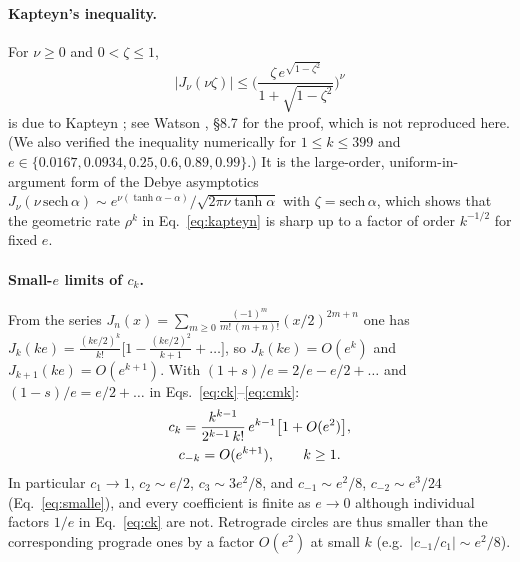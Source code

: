 \paragraph*{Kapteyn's inequality.}
For $\nu\ge0$ and $0<\zeta\le1$,
\begin{equation}
|J_\nu(\nu\zeta)|\le\Bigg(\frac{\zeta\,e^{\sqrt{1-\zeta^2}}}{1+\sqrt{1-\zeta^2}}\Bigg)^{\nu}
\label{eq:kapteyn-app}
\end{equation}
is due to Kapteyn \cite{Kapteyn1893}; see Watson \cite{Watson1944}, \S8.7 for
the proof, which is not reproduced here. (We also verified the inequality
numerically for $1\le k\le399$ and $e\in\{0.0167,0.0934,0.25,0.6,0.89,0.99\}$.)
It is the large-order, uniform-in-argument form of the Debye asymptotics
$J_\nu(\nu\,\mathrm{sech}\,\alpha)\sim e^{\nu(\tanh\alpha-\alpha)}/\sqrt{2\pi\nu\tanh\alpha}$
with $\zeta=\mathrm{sech}\,\alpha$, which shows that the geometric rate
$\rho^k$ in Eq.~\eqref{eq:kapteyn} is sharp up to a factor of order
$k^{-1/2}$ for fixed $e$.

\paragraph*{Small-$e$ limits of $c_k$.}
From the series $J_n(x)=\sum_{m\ge0}\frac{(-1)^m}{m!\,(m+n)!}(x/2)^{2m+n}$ one has
$J_k(ke)=\frac{(ke/2)^k}{k!}\big[1-\frac{(ke/2)^2}{k+1}+\dots\big]$, so
$J_k(ke)=O(e^k)$ and $J_{k+1}(ke)=O(e^{k+1})$. With $(1+s)/e=2/e-e/2+\dots$ and
$(1-s)/e=e/2+\dots$ in Eqs.~\eqref{eq:ck}--\eqref{eq:cmk}:
\begin{gather}
c_k=\frac{k^{k-1}}{2^{k-1}\,k!}\,e^{k-1}\big[1+O(e^2)\big],\notag\\
c_{-k}=O(e^{k+1}),\qquad k\ge1.
\label{eq:cksmall}
\end{gather}
In particular $c_1\to1$, $c_2\sim e/2$, $c_3\sim 3e^2/8$, and
$c_{-1}\sim e^2/8$, $c_{-2}\sim e^3/24$ (Eq.~\eqref{eq:smalle}), and
every coefficient is finite as $e\to0$ although individual factors $1/e$ in
Eq.~\eqref{eq:ck} are not. Retrograde circles are thus smaller than the corresponding
prograde ones by a factor $O(e^2)$ at small $k$ (e.g.\ $|c_{-1}/c_1|\sim e^2/8$).
